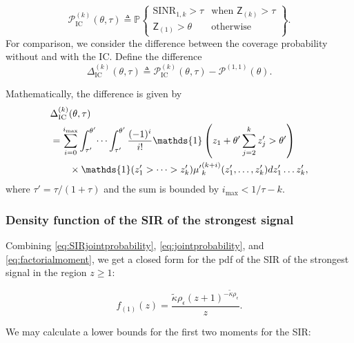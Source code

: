 \documentclass[lettersize,journal]{IEEEtran}
\begin{document}
\begin{equation}
  \mathcal{P}^{(k)}_{\text{IC}}(\theta,\tau) \triangleq \mathbb{P}\begin{Bmatrix} \text{SINR}_{1,k}>\tau & \text{when } \mathsf{Z}_{(k)}>\tau \\
\mathsf{Z}_{(1)}>\theta & \text{otherwise} \end{Bmatrix}.
\end{equation}
For comparison, we consider the difference between the coverage probability without and with the IC. Define the difference
\begin{equation}
  \Delta^{(k)}_{\text{IC}}(\theta,\tau) \triangleq \mathcal{P}^{(k)}_{\text{IC}}(\theta,\tau)- \mathcal{P}^{(1,1)}(\theta).
\end{equation}

Mathematically, the difference is given by
  \begin{align}
    &\Delta^{(k)}_{\text{IC}}(\theta,\tau) \nonumber\\
    &= \sum^{i_{\text{max}}}_{i=0} \int_{\tau'}^{\theta'} \dots \int_{\tau'}^{\theta'}\frac{(-1)^i}{i!}\mathds{1}\left(z_1+  \theta'\sum_{j=2}^k z'_j>\theta' \right) \nonumber \\
    &\hspace{0.7cm}\times \mathds{1}(z'_1>\dots>z'_k){\mu'}_k^{(k+i)}(z'_1,\dots,z'_k) d z'_1 \dots z'_k,
  \end{align}
  where $\tau' = \tau/(1+\tau)$ and the sum is bounded by $i_{\text{max}}< 1/\tau-k$. 



  \subsubsection{Density function of the SIR of the strongest signal}
Combining \eqref{eq:SIRjointprobability}, \eqref{eq:jointprobability}, and \eqref{eq:factorialmoment}, we get a closed form for the pdf of the SIR of the strongest signal in the region $z\geq 1$:


\begin{equation}
  \label{eq:SIR1}
  f_{(1)}(z) = \frac {\tilde{\kappa}\rho_{\epsilon}\left({z + 1} \right)^{-\tilde{\kappa}\rho_{\epsilon}}} {z}.
\end{equation}


We may calculate a lower bounds for the first two moments for the SIR:
\end{document}
